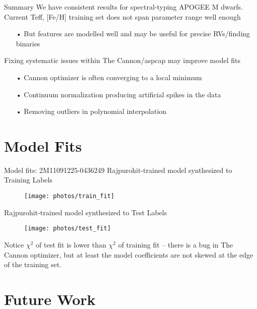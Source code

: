 \documentclass[compress]{beamer}
\begin{document}
\begin{frame}{Summary}
We have consistent results for spectral-typing APOGEE M dwarfs. \\

Current {Teff, [Fe/H]} training set does not span parameter range well enough
\begin{enumerate} 
	\item[•] But features are modelled well and may be useful for precise RVs/finding binaries
\end{enumerate}

Fixing systematic issues within The Cannon/aspcap may improve model fits
\begin{enumerate} 
	\item[•] Cannon optimizer is often converging to a local minimum
	\item[•] Continuum normalization producing artificial spikes in the data
	\item[•] Removing outliers in polynomial interpolation
\end{enumerate}
\end{frame}


\section{Model Fits}


\begin{frame}{Model fits: 2M11091225-0436249}
Rajpurohit-trained model synthesized to \textcolor{sthlmDarkGreen}{Training Labels}
\begin{figure}
	\texttt{[image: photos/train\_fit]}   
\end{figure}
Rajpurohit-trained model synthesized to \textcolor{sthlmDarkGreen}{Test Labels}
\begin{figure}
	\texttt{[image: photos/test\_fit]}   
\end{figure}
\small
Notice $\chi^{2}$ of test fit is lower than $\chi^{2}$ of training fit -- there is a bug in The Cannon optimizer, but at least the model coefficients are not skewed at the edge of the training set.
\end{frame}


\section{Future Work}
\end{document}
